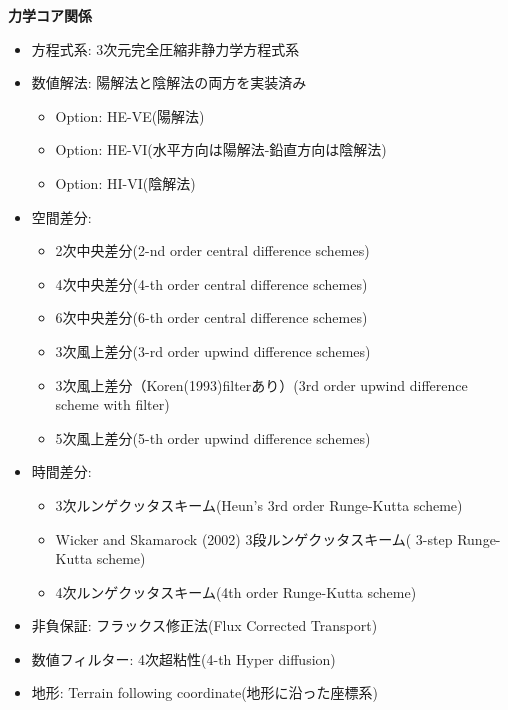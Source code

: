 {\bf 力学コア関係}
\begin{itemize}
 \item 方程式系: 3次元完全圧縮非静力学方程式系
 \item 数値解法: 陽解法と陰解法の両方を実装済み
   \begin{itemize}
    \item Option: HE-VE(陽解法)
    \item Option: HE-VI(水平方向は陽解法-鉛直方向は陰解法)
    \item Option: HI-VI(陰解法)
   \end{itemize}
 \item 空間差分:
    \begin{itemize}
      \item 2次中央差分(2-nd order central difference schemes)
      \item 4次中央差分(4-th order central difference schemes)
      \item 6次中央差分(6-th order central difference schemes)
      \item 3次風上差分(3-rd order upwind difference schemes)
      \item 3次風上差分（Koren(1993)filterあり）(3rd order upwind difference scheme with \cite{Koren_1993} filter)
      \item 5次風上差分(5-th order upwind difference schemes)
    \end{itemize}
 \item 時間差分:
    \begin{itemize}
      \item 3次ルンゲクッタスキーム(Heun's 3rd order Runge-Kutta scheme)
      \item Wicker and Skamarock (2002) 3段ルンゲクッタスキーム(\citet{Wicker_2002} 3-step Runge-Kutta scheme)
      \item 4次ルンゲクッタスキーム(4th order Runge-Kutta scheme)
    \end{itemize}
 \item 非負保証: フラックス修正法(Flux Corrected Transport)
 \item 数値フィルター: 4次超粘性(4-th Hyper diffusion)
 \item 地形: Terrain following coordinate(地形に沿った座標系)
\end{itemize}


